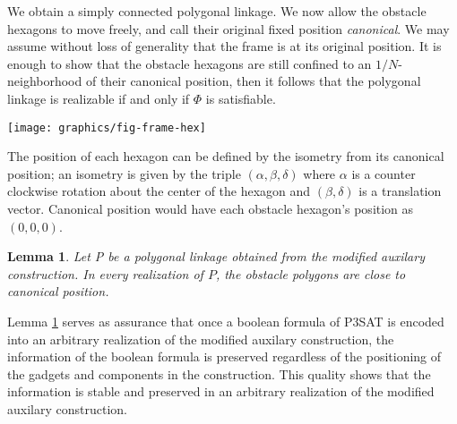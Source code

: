 \documentclass[10pt]{CSUNthesis}
\theoremstyle{plain}%
\newtheorem{lem}{Lemma}
\theoremstyle{definition}
\theoremstyle{remark}
\newcommand{\lr}[1]{\left( #1 \right)}
\begin{document}
We obtain a simply connected polygonal linkage. 
We now allow the obstacle hexagons to move freely, and call their original fixed position \emph{canonical}. 
We may assume without loss of generality that the frame is at its original position. 
It is enough to show that the obstacle hexagons are still confined to an $1/N$-neighborhood of their canonical position, then it follows that the polygonal linkage is realizable if and only if $\Phi$ is satisfiable.

\begin{minipage}{\linewidth}
	\begin{center}
	\texttt{[image: graphics/fig-frame-hex]}
	\label{fig:frame}
	\end{center}
\end{minipage}

The position of each hexagon can be defined by the isometry from its canonical position; an isometry is given by the triple $\lr{\alpha, \beta, \delta}$ where $\alpha$ is a counter clockwise rotation about the center of the hexagon and $\lr{\beta,\delta}$ is a translation vector.  
Canonical position would have each obstacle hexagon's position as $(0,0,0)$.
\begin{lem}\label{lem:aux-C}
Let P be a polygonal linkage obtained from the modified auxilary construction.  
In every realization of $P$, the obstacle polygons are close to canonical position.
\end{lem}

Lemma \ref{lem:aux-C} serves as assurance that once a boolean formula of P3SAT is encoded into an arbitrary realization of the modified auxilary construction, the information of the boolean formula is preserved regardless of the positioning of the gadgets and components in the construction.
This quality shows that the information is stable and preserved in an arbitrary realization of the modified auxilary construction.
\end{document}
